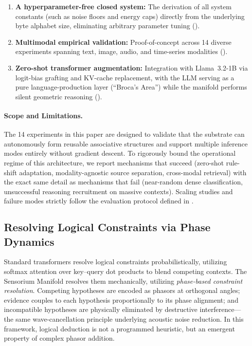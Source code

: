 \documentclass[11pt,a4paper]{article}
\begin{document}
\begin{enumerate}[nosep]
  \item \textbf{A hyperparameter-free closed system:} The derivation of all system constants (such as noise floors and energy caps) directly from the underlying byte alphabet size, eliminating arbitrary parameter tuning ().
  \item \textbf{Multimodal empirical validation:} Proof-of-concept across 14 diverse experiments spanning text, image, audio, and time-series modalities ().
  \item \textbf{Zero-shot transformer augmentation:} Integration with Llama~3.2-1B via logit-bias grafting and KV-cache replacement, with the LLM serving as a pure language-production layer (``Broca's Area'') while the manifold performs silent geometric reasoning ().
\end{enumerate}

\paragraph{Scope and Limitations.}
The 14 experiments in this paper are designed to validate that the substrate can autonomously form reusable associative structures and support multiple inference modes entirely without gradient descent. To rigorously bound the operational regime of this architecture, we report mechanisms that succeed (zero-shot rule-shift adaptation, modality-agnostic source separation, cross-modal retrieval) with the exact same detail as mechanisms that fail (near-random dense classification, unsuccessful reasoning recruitment on massive contexts). Scaling studies and failure modes strictly follow the evaluation protocol defined in .


\subsection{Resolving Logical Constraints via Phase Dynamics}
\label{sec:superposition_headline}

Standard transformers resolve logical constraints probabilistically, utilizing softmax attention over key--query dot products to blend competing contexts. The Sensorium Manifold resolves them mechanically, utilizing \emph{phase-based constraint resolution}. Competing hypotheses are encoded as phasors at orthogonal angles; evidence couples to each hypothesis proportionally to its phase alignment; and incompatible hypotheses are physically eliminated by destructive interference---the same wave-cancellation principle underlying acoustic noise reduction. In this framework, logical deduction is not a programmed heuristic, but an emergent property of complex phasor addition.
\end{document}
